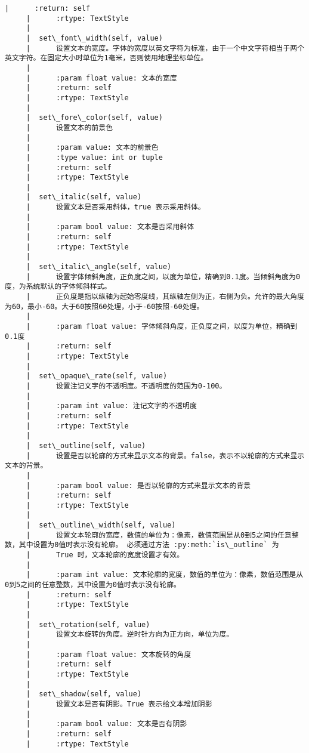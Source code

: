 \documentclass[11pt]{article}
\begin{document}
\begin{Verbatim}[commandchars=\\\{\}]
     |      :return: self
     |      :rtype: TextStyle
     |  
     |  set\_font\_width(self, value)
     |      设置文本的宽度。字体的宽度以英文字符为标准，由于一个中文字符相当于两个英文字符。在固定大小时单位为1毫米，否则使用地理坐标单位。
     |      
     |      :param float value: 文本的宽度
     |      :return: self
     |      :rtype: TextStyle
     |  
     |  set\_fore\_color(self, value)
     |      设置文本的前景色
     |      
     |      :param value: 文本的前景色
     |      :type value: int or tuple
     |      :return: self
     |      :rtype: TextStyle
     |  
     |  set\_italic(self, value)
     |      设置文本是否采用斜体，true 表示采用斜体。
     |      
     |      :param bool value: 文本是否采用斜体
     |      :return: self
     |      :rtype: TextStyle
     |  
     |  set\_italic\_angle(self, value)
     |      设置字体倾斜角度，正负度之间，以度为单位，精确到0.1度。当倾斜角度为0度，为系统默认的字体倾斜样式。
     |      正负度是指以纵轴为起始零度线，其纵轴左侧为正，右侧为负。允许的最大角度为60，最小-60。大于60按照60处理，小于-60按照-60处理。
     |      
     |      :param float value: 字体倾斜角度，正负度之间，以度为单位，精确到0.1度
     |      :return: self
     |      :rtype: TextStyle
     |  
     |  set\_opaque\_rate(self, value)
     |      设置注记文字的不透明度。不透明度的范围为0-100。
     |      
     |      :param int value: 注记文字的不透明度
     |      :return: self
     |      :rtype: TextStyle
     |  
     |  set\_outline(self, value)
     |      设置是否以轮廓的方式来显示文本的背景。false，表示不以轮廓的方式来显示文本的背景。
     |      
     |      :param bool value: 是否以轮廓的方式来显示文本的背景
     |      :return: self
     |      :rtype: TextStyle
     |  
     |  set\_outline\_width(self, value)
     |      设置文本轮廓的宽度，数值的单位为：像素，数值范围是从0到5之间的任意整数，其中设置为0值时表示没有轮廓。 必须通过方法 :py:meth:`is\_outline` 为
     |      True 时，文本轮廓的宽度设置才有效。
     |      
     |      :param int value: 文本轮廓的宽度，数值的单位为：像素，数值范围是从0到5之间的任意整数，其中设置为0值时表示没有轮廓。
     |      :return: self
     |      :rtype: TextStyle
     |  
     |  set\_rotation(self, value)
     |      设置文本旋转的角度。逆时针方向为正方向，单位为度。
     |      
     |      :param float value: 文本旋转的角度
     |      :return: self
     |      :rtype: TextStyle
     |  
     |  set\_shadow(self, value)
     |      设置文本是否有阴影。True 表示给文本增加阴影
     |      
     |      :param bool value: 文本是否有阴影
     |      :return: self
     |      :rtype: TextStyle

\end{Verbatim}
\end{document}
